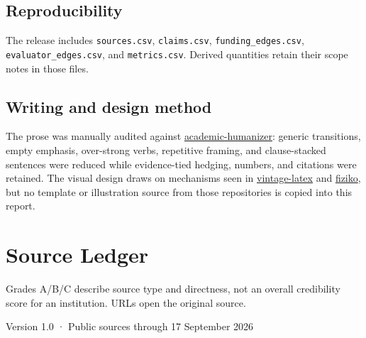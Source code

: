 \documentclass[11pt,twoside]{article}
\begin{document}
\subsection*{Reproducibility}
The release includes \texttt{sources.csv}, \texttt{claims.csv}, \texttt{funding\_edges.csv}, \texttt{evaluator\_edges.csv}, and \texttt{metrics.csv}. Derived quantities retain their scope notes in those files.

\subsection*{Writing and design method}
The prose was manually audited against \href{https://github.com/AIScientists-Dev/academic-humanizer}{academic-humanizer}: generic transitions, empty emphasis, over-strong verbs, repetitive framing, and clause-stacked sentences were reduced while evidence-tied hedging, numbers, and citations were retained. The visual design draws on mechanisms seen in \href{https://github.com/Foadsf/vintage-latex}{vintage-latex} and \href{https://github.com/jemmybutton/fiziko}{fiziko}, but no template or illustration source from those repositories is copied into this report.

\clearpage
\section{Source Ledger}
\small
Grades A/B/C describe source type and directness, not an overall credibility score for an institution. URLs open the original source.
\medskip

\normalsize

\printerrule
\begin{center}
\footnotesize Version 1.0 · Public sources through 17 September 2026
\end{center}
\end{document}

